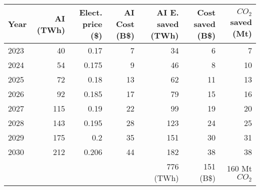 \begin{table}[H]
    \centering
    \footnotesize
    \begin{tabular}{|lrrrrrr}
        \toprule
        Year & AI (TWh) & Elect. price (\$) & AI Cost (B\$) & AI E. saved (TWh) & Cost saved (B\$)  & $CO_2$ saved (Mt)  \\
        \midrule
        2023 & 40  & 0.17  & 7  & 34  & 6  & 7  \\
        2024 & 54  & 0.175 & 9  & 46  & 8  & 10 \\
        2025 & 72  & 0.18  & 13 & 62  & 11 & 13 \\
        2026 & 92  & 0.185 & 17 & 79  & 15 & 16 \\
        2027 & 115 & 0.19  & 22 & 99  & 19 & 20 \\
        2028 & 143 & 0.195 & 28 & 123 & 24 & 25 \\
        2029 & 175 & 0.2   & 35 & 151 & 30 & 31 \\
        2030 & 212 & 0.206 & 44 & 182 & 38 & 38 \\
        \midrule
        & & & & 776 (TWh) & 151 (B\$) & 160 Mt $CO_2$ \\
        \bottomrule
    \end{tabular}
    \caption{}
    \label{tab:ai_summary}
\end{table}
